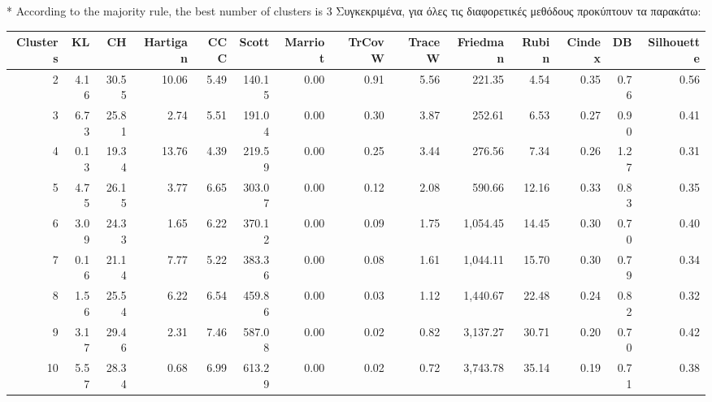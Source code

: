 \documentclass[a4paper,twoside,10pt]{article}
\begin{document}
	* According to the majority rule, the best number of clusters is  3
	Συγκεκριμένα, για όλες τις διαφορετικές μεθόδους προκύπτουν τα παρακάτω:
\begin{table}[ht]
	\centering
	\tabcolsep=0.11cm
	\begin{tabular}{|r|rrrr|rrrrr|rrrr|}
		\hline
		Clusters& KL & CH & Hartigan & CCC & Scott & Marriot & TrCovW & TraceW & Friedman & Rubin & Cindex & DB & Silhouette \\
		\hline
		2 & 4.16 & 30.55 & 10.06 & 5.49 & 140.15 & 0.00 & 0.91 & 5.56 & 221.35 & 4.54 & 0.35 & 0.76 & 0.56 \\
		\rowcolor[rgb]{0.9,0.9,0.9} 3 & 6.73 & 25.81 & 2.74 & 5.51 & 191.04 & 0.00 & 0.30 & 3.87 & 252.61 & 6.53 & 0.27 & 0.90 & 0.41 \\
		4 & 0.13 & 19.34 & 13.76 & 4.39 & 219.59 & 0.00 & 0.25 & 3.44 & 276.56 & 7.34 & 0.26 & 1.27 & 0.31 \\ 
		5 & 4.75 & 26.15 & 3.77 & 6.65 & 303.07 & 0.00 & 0.12 & 2.08 & 590.66 & 12.16 & 0.33 & 0.83 & 0.35 \\
		6 & 3.09 & 24.33 & 1.65 & 6.22 & 370.12 & 0.00 & 0.09 & 1.75 & 1,054.45 & 14.45 & 0.30 & 0.70 & 0.40 \\ 
		7 & 0.16 & 21.14 & 7.77 & 5.22 & 383.36 & 0.00 & 0.08 & 1.61 & 1,044.11 & 15.70 & 0.30 & 0.79 & 0.34 \\
		8 & 1.56 & 25.54 & 6.22 & 6.54 & 459.86 & 0.00 & 0.03 & 1.12 & 1,440.67 & 22.48 & 0.24 & 0.82 & 0.32 \\
		9 & 3.17 & 29.46 & 2.31 & 7.46 & 587.08 & 0.00 & 0.02 & 0.82 & 3,137.27 & 30.71 & 0.20 & 0.70 & 0.42 \\ 
		10 & 5.57 & 28.34 & 0.68 & 6.99 & 613.29 & 0.00 & 0.02 & 0.72 & 3,743.78 & 35.14 & 0.19 & 0.71 & 0.38 \\
		\hline
	\end{tabular}
\end{table}
\end{document}
